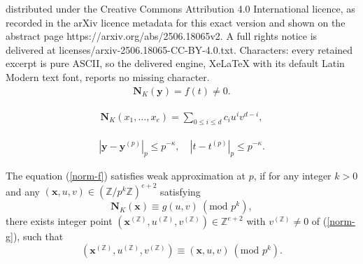 \documentclass[10pt,a4paper]{amsart}
\newcommand{\NNN}{\mathbf{N}}
\newcommand{\ZZ}{\mathbb{Z}}
\newcommand{\xx}{\mathbf{x}}
\newcommand{\yy}{\mathbf{y}}
\renewcommand{\leq}{\leqslant}
\renewcommand{\mod}{\mathrm{mod}\,}
\begin{document}
distributed under the Creative Commons Attribution 4.0 International licence, as recorded in the arXiv licence metadata for this exact version and shown on the abstract page https://arxiv.org/abs/2506.18065v2. A full rights notice is delivered at licenses/arxiv-2506.18065-CC-BY-4.0.txt. Characters: every retained excerpt is pure ASCII, so the delivered engine, XeLaTeX with its default Latin Modern text font, reports no missing character.
\begin{eqnarray}\label{norm-f}
	\mathbf{N}_K(\mathbf{y}) = f(t) \neq 0.
\end{eqnarray}

	\begin{eqnarray}\label{norm-g}
		\mathbf{N}_K(x_1, \dots, x_e) = \sum_{0 \leq i \leq d} c_i u^i v^{d-i},
	\end{eqnarray}

\begin{align}\label{cond-WA-1}
	|\yy - \yy^{(p)} |_p \leq p^{-\kappa}, \quad |t - t^{(p)}|_p \leq p^{-\kappa}.
\end{align}

\begin{lemma}
	The equation (\ref{norm-f}) satisfies weak approximation at $p$, if for any integer $k > 0$ and any $(\xx, u, v) \in (\ZZ / p^k \ZZ)^{e+2}$ satisfying 
	$$\NNN_K(\xx) \equiv g(u, v) \ (\mod \, p^k),$$ 
	there exists integer point $(\xx^{(\ZZ)}, u^{(\ZZ)}, v^{(\ZZ)}) \in \ZZ^{e+2}$ with $v^{(\ZZ)} \neq 0$ of (\ref{norm-g}), such that 
	$$(\xx^{(\ZZ)}, u^{(\ZZ)}, v^{(\ZZ)}) \equiv (\xx, u, v) \ (\mod \, p^k). $$
\end{lemma}
\end{document}
